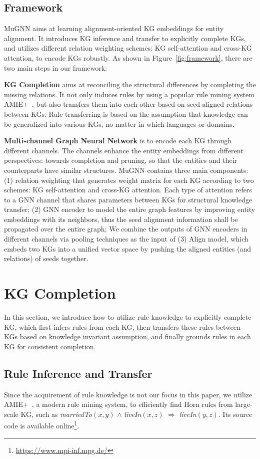 \documentclass[11pt,a4paper]{article}
\newcommand{\vpara}[1]{\vspace{0.1in}\noindent\textbf{#1 }}
\begin{document}
\subsection{Framework}
MuGNN aims at learning alignment-oriented KG embeddings for entity alignment. It introduces KG inference and transfer to explicitly complete KGs, and utilizes different relation weighting schemes: KG self-attention and cross-KG attention, to encode KGs robustly. As shown in Figure~\ref{fig:framework}, there are two main steps in our framework:

\vpara{KG Completion} aims at reconciling the structural differences by completing the missing relations. It not only induces rules by using a popular rule mining system AMIE+~\cite{galarraga2015fast}, but also transfers them into each other based on seed aligned relations between KGs. Rule transferring is based on the assumption that knowledge can be generalized into various KGs, no matter in which languages or domains.

\vpara{Multi-channel Graph Neural Network} is to encode each KG through different channels. The channels enhance the entity embeddings from different perspectives: towards completion and pruning, so that the entities and their counterparts have similar structures. MuGNN contains three main components: (1) relation weighting that generates weight matrix for each KG according to two schemes: KG self-attention and cross-KG attention. Each type of attention refers to a GNN channel that shares parameters between KGs for structural knowledge transfer; (2) GNN encoder to model the entire graph features by improving entity embeddings with its neighbors, thus the seed alignment information shall be propagated over the entire graph; We combine the outputs of GNN encoders in different channels via pooling techniques as the input of (3) Align model, which embeds two KGs into a unified vector space by pushing the aligned entities (and relations) of seeds together.

\section{KG Completion}
In this section, we introduce how to utilize rule knowledge to explicitly complete KG, which first infers rules from each KG, then transfers these rules between KGs based on knowledge invariant assumption, and finally grounds rules in each KG for consistent completion.

\subsection{Rule Inference and Transfer}
Since the acquirement of rule knowledge is not our focus in this paper, we utilize AMIE+~\cite{galarraga2015fast}, a modern rule mining system, to efficiently find Horn rules from large-scale KG, such as \textit{marriedTo}$(x,y)$ $\wedge$ \textit{liveIn}$(x,z)$ $\Rightarrow$ \textit{liveIn}$(y,z)$. Its source code is available online\footnote{\url{https://www.mpi-inf.mpg.de/}}.
\end{document}
